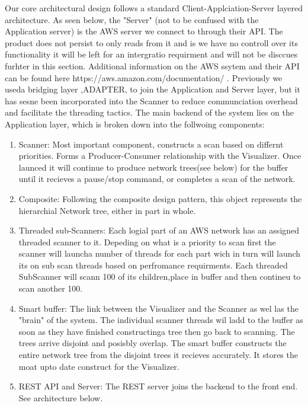 \documentclass[hidelinks,a4paper,12pt]{article}
\begin{document}
Our core architectural design follows a standard Client-Applciation-Server layered architecture. As seen below, the "Server" (not to be confused with the Application server) is the AWS server we connect to through their API. The product does not persist to only reads from it and is we have no controll over its functionality it will be left for an intergratio requirment and will not be disccues furhter in this section. Additional information on the AWS ssytem and their API can be found here https://aws.amazon.com/documentation/ . Previously we useda  bridging layer ,ADAPTER, to join the Application and Server layer, but  it has sesne been incorporated into the Scanner to reduce communciation overhead and facilitate the threading tactics. The main backend of the system lies on the Application layer, which is broken down into the follwoing components:
\begin{enumerate}  
					\item Scanner: Most important component, constructs a scan based on differnt priorities. Forms a Producer-Consumer relationship with the Visualizer. Once launced it will continue to produce network trees(see below) for the buffer until it recieves a pause/stop command, or completes a scan of the network. 
					\item Composite:  Following the composite design pattern, this object represents the hierarchial Network tree, either in part in whole.  
					\item Threaded sub-Scanners: Each logial part of an AWS network has an assigned threaded scanner to it. Depeding on what is a priority to scan first the scanner will launcha number of threads for each part wich in turn will launch its on sub scan threads based on perfromance requirments. Each threaded SubScanner will scann 100 of its children,place in buffer and then contineu to scan another 100. 
					\item Smart buffer: The link between the Visualizer and the Scanner as wel las the "brain" of the system. The individual scanner threads wil ladd to the buffer as soon as they have finished constructinga tree then go back to scanning. The trees arrive disjoint and posisbly overlap. The smart buffer constructs the entire network tree from the disjoint trees it recieves accurately. It stores the moat upto date construct for the Visualizer.
				\item REST API and Server: The REST server joins the backend to the front end. See architecture below.
				\end{enumerate}
\end{document}
